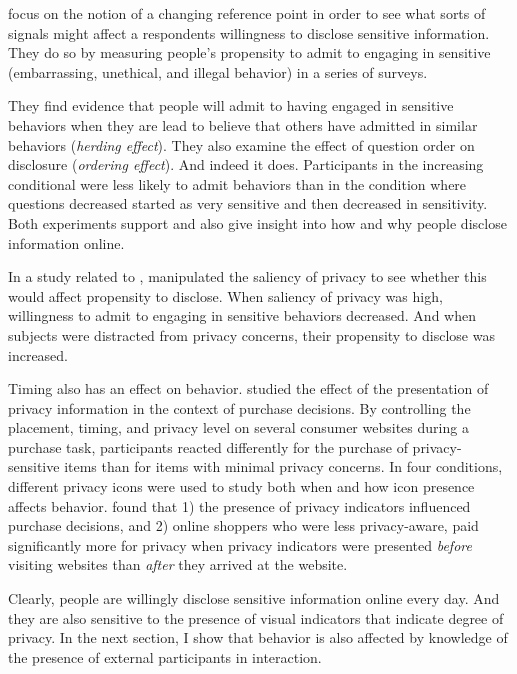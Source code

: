  \cite{Acquisti:2012tp}  focus on the notion of a changing reference point in order to see what sorts of signals might affect a respondents willingness to disclose sensitive information. They do so by measuring people's propensity to admit to engaging in sensitive (embarrassing, unethical, and illegal behavior) in a series of surveys.

They find evidence that people will admit to having engaged in sensitive behaviors when they are lead to believe that others have admitted in similar behaviors (\emph{herding effect}). They also examine the effect of question order on disclosure (\emph{ordering effect}). And indeed it does. Participants in the increasing conditional were less likely to admit behaviors than in the condition where questions decreased started as very sensitive and then decreased in sensitivity. Both experiments support  \cite{Kahneman:1979wl}  and also give insight into how and why people disclose information online.

In a study related to  \cite{Acquisti:2012tp}, \cite{John:2009wg}  manipulated the saliency of privacy to see whether this would affect propensity to disclose. When saliency of privacy was high, willingness to admit to engaging in sensitive behaviors decreased. And when subjects were distracted from privacy concerns, their propensity to disclose was increased.

Timing also has an effect on behavior.  \citet*{Egelman:2009ut}  studied the effect of the presentation of privacy information in the context of purchase decisions. By controlling the placement, timing, and privacy level on several consumer websites during a purchase task, participants reacted differently for the purchase of privacy-sensitive items than for items with minimal privacy concerns. In four conditions, different privacy icons were used to study both when and how icon presence affects behavior.  \citet{Egelman:2009ut}  found that 1) the presence of privacy indicators influenced purchase decisions, and 2) online shoppers who were less privacy-aware, paid significantly more for privacy when privacy indicators were presented \emph{before} visiting websites than \emph{after} they arrived at the website.

Clearly, people are willingly disclose sensitive information online every day. And they are also sensitive to the presence of visual indicators that indicate degree of privacy. In the next section, I show that behavior is also affected by knowledge of the presence of external participants in interaction.

